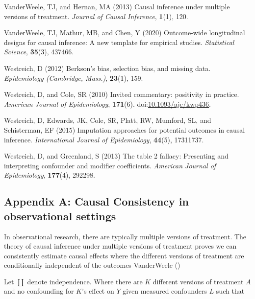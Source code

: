 \documentclass[
  singlecolumn]{article}
\newlength{\cslhangindent}
\newenvironment{CSLReferences}[2] %
 {\begin{list}{}{%
  \setlength{\itemindent}{0pt}
  \setlength{\leftmargin}{0pt}
  \setlength{\parsep}{0pt}
  \ifodd #1
   \setlength{\leftmargin}{\cslhangindent}
   \setlength{\itemindent}{-1\cslhangindent}
  \fi
  \setlength{\itemsep}{#2\baselineskip}}}
 {\end{list}}
\begin{document}
\begin{CSLReferences}{1}{0}
VanderWeele, TJ, and Hernan, MA (2013) Causal inference under multiple
versions of treatment. \emph{Journal of Causal Inference},
\textbf{1}(1), 120.

VanderWeele, TJ, Mathur, MB, and Chen, Y (2020) Outcome-wide
longitudinal designs for causal inference: A new template for empirical
studies. \emph{Statistical Science}, \textbf{35}(3), 437466.

Westreich, D (2012) Berkson's bias, selection bias, and missing data.
\emph{Epidemiology (Cambridge, Mass.)}, \textbf{23}(1), 159.

Westreich, D, and Cole, SR (2010) Invited commentary: positivity in
practice. \emph{American Journal of Epidemiology}, \textbf{171}(6).
doi:\href{https://doi.org/10.1093/aje/kwp436}{10.1093/aje/kwp436}.

Westreich, D, Edwards, JK, Cole, SR, Platt, RW, Mumford, SL, and
Schisterman, EF (2015) Imputation approaches for potential outcomes in
causal inference. \emph{International Journal of Epidemiology},
\textbf{44}(5), 17311737.

Westreich, D, and Greenland, S (2013) The table 2 fallacy: Presenting
and interpreting confounder and modifier coefficients. \emph{American
Journal of Epidemiology}, \textbf{177}(4), 292298.

\end{CSLReferences}

\subsection{Appendix A: Causal Consistency in observational
settings}\label{appendix-a-causal-consistency-in-observational-settings}

In observational research, there are typically multiple versions of
treatment. The theory of causal inference under multiple versions of
treatment proves we can consistently estimate causal effects where the
different versions of treatment are conditionally independent of the
outcomes VanderWeele ()

Let \(\coprod\) denote independence. Where there are \(K\) different
versions of treatment \(A\) and no confounding for \(K\)'s effect on
\(Y\) given measured confounders \(L\) such that
\end{document}
